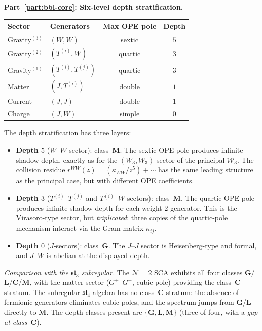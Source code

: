 \begin{computation}
\medskip
\noindent\textbf{Part~\ref{part:bbl-core}: Six-level depth stratification.}

\begin{center}
\renewcommand{\arraystretch}{1.15}
\begin{tabular}{llcc}
\textbf{Sector} & \textbf{Generators}
 & \textbf{Max OPE pole} & \textbf{Depth} \\
\hline
Gravity$^{(3)}$ & $(W,W)$ & sextic & $5$ \\
Gravity$^{(2)}$ & $(T^{(i)},W)$ & quartic & $3$ \\
Gravity$^{(1)}$ & $(T^{(i)},T^{(j)})$ & quartic & $3$ \\
Matter & $(J,T^{(i)})$ & double & $1$ \\
Current & $(J,J)$ & double & $1$ \\
Charge & $(J,W)$ & simple & $0$
\end{tabular}
\end{center}

The depth stratification has three layers:
\begin{itemize}
\item \textbf{Depth $5$} ($W$--$W$ sector): class~$\mathbf{M}$.
 The sextic OPE pole produces infinite shadow depth,
 exactly as for the $(W_3,W_3)$ sector of the principal
 $\mathcal W_3$. The collision residue
 $r^{WW}(z) = (\kappa_{WW}/z^5) + \cdots$ has
 the same leading structure as the principal case, but
 with different OPE coefficients.
\item \textbf{Depth $3$} ($T^{(i)}$--$T^{(j)}$ and
 $T^{(i)}$--$W$ sectors): class~$\mathbf{M}$.
 The quartic OPE pole produces infinite shadow depth for
 each weight-$2$ generator. This is the Virasoro-type
 sector, but \emph{triplicated}: three copies of the
 quartic-pole mechanism interact via the Gram matrix
 $\kappa_{ij}$.
\item \textbf{Depth $0$} ($J$-sectors):
 class~$\mathbf{G}$.
 The $J$--$J$ sector is Heisenberg-type and formal, and $J$--$W$
 is abelian at the displayed depth.
\end{itemize}

\emph{Comparison with the $\mathfrak{sl}_3$ subregular.}
The $\mathcal N=2$ SCA exhibits all four classes
$\mathbf{G}$/$\mathbf{L}$/$\mathbf{C}$/$\mathbf{M}$, with
the matter sector ($G^+$--$G^-$, cubic pole) providing the
class~$\mathbf{C}$ stratum. The subregular
$\mathfrak{sl}_4$ algebra has no class~$\mathbf{C}$
stratum: the absence of fermionic generators eliminates
cubic poles, and the spectrum jumps from
$\mathbf{G}$/$\mathbf{L}$ directly to $\mathbf{M}$. The
depth classes present are $\{\mathbf{G}, \mathbf{L}, \mathbf{M}\}$
(three of four, with a \emph{gap at class~$\mathbf{C}$}).


\end{computation}
